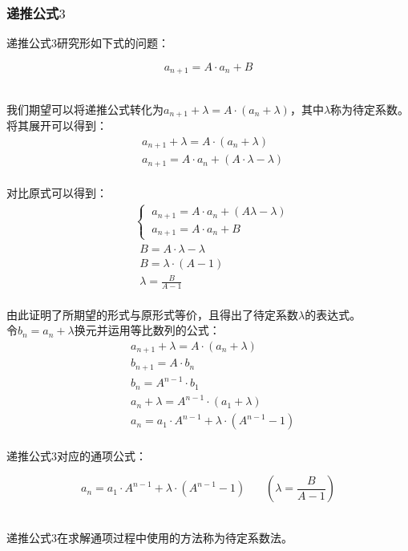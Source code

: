 \documentclass[UTF8]{ctexart}
\begin{document}
\subsubsection{递推公式$3$}
    \setcounter{equation}{0}
    递推公式$3$研究形如下式的问题：
    \begin{large}
        \begin{equation*}
            a_{n+1}=A\cdot a_n+B
        \end{equation*}
    \end{large}\\
    我们期望可以将递推公式转化为$a_{n+1}+\lambda=A\cdot(a_n+\lambda)$，其中$\lambda$称为待定系数。\\[3mm]
    将其展开可以得到：
    \begin{align}
        &a_{n+1}+\lambda=A\cdot(a_n+\lambda)\\[3mm]
        &a_{n+1}=A\cdot a_n+(A\cdot \lambda-\lambda)
    \end{align}\\
    对比原式可以得到：
    \begin{align}
        &\begin{cases}
            ~a_{n+1}=A\cdot a_n+(A\lambda-\lambda)\\[1mm]
            ~a_{n+1}=A\cdot a_n+B
        \end{cases}\\[3mm]
        &~~B=A\cdot\lambda-\lambda\\[3mm]
        &~~B=\lambda\cdot(A-1)\\[3mm]
        &~~\lambda=\frac{B}{A-1}
    \end{align}\\
    由此证明了所期望的形式与原形式等价，且得出了待定系数$\lambda$的表达式。\\[3mm]
    令$b_n=a_n+\lambda$换元并运用等比数列的公式：
    \begin{align}
        &a_{n+1}+\lambda=A\cdot(a_n+\lambda)\\[3mm]
        &b_{n+1}=A\cdot b_n\\[3mm]
        &b_{n}=A^{n-1}\cdot b_1\\[3mm]
        &a_{n}+\lambda=A^{n-1}\cdot(a_1+\lambda)\\[3mm]
        &a_{n}=a_1\cdot A^{n-1}+\lambda\cdot(A^{n-1}-1)
    \end{align}\\
    递推公式$3$对应的通项公式：
    \begin{large}
        \begin{equation*}
            a_n=a_1\cdot A^{n-1}+\lambda\cdot (A^{n-1}-1)~~~~~~~~\left(\lambda=\frac{B}{A-1}\right)    
        \end{equation*}
    \end{large}\\
    递推公式$3$在求解通项过程中使用的方法称为待定系数法。
\end{document}
